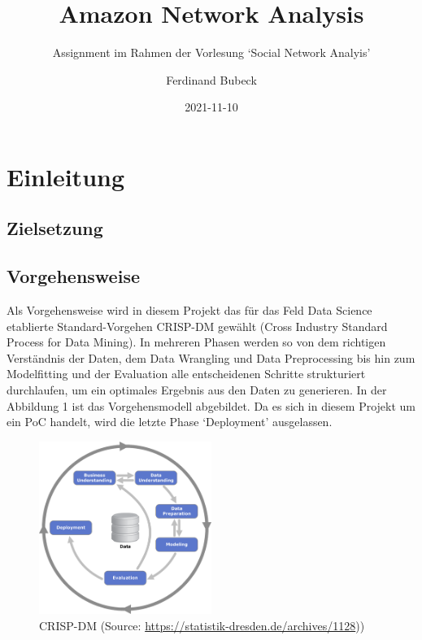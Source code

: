 \documentclass[
  12 pt,
]{article}
\title{Amazon Network Analysis}
\subtitle{Assignment im Rahmen der Vorlesung `Social Network Analyis'}
\author{Ferdinand Bubeck}
\date{2021-11-10}
\begin{document}
\maketitle

\renewcommand*\contentsname{Inhaltsverzeichnis}
{
\setcounter{tocdepth}{2}
\tableofcontents
}
\newpage

\hypertarget{einleitung}{%
\section{Einleitung}\label{einleitung}}

\hypertarget{zielsetzung}{%
\subsection{Zielsetzung}\label{zielsetzung}}

\hypertarget{vorgehensweise}{%
\subsection{Vorgehensweise}\label{vorgehensweise}}

Als Vorgehensweise wird in diesem Projekt das für das Feld Data Science
etablierte Standard-Vorgehen CRISP-DM gewählt (Cross Industry Standard
Process for Data Mining). In mehreren Phasen werden so von dem richtigen
Verständnis der Daten, dem Data Wrangling und Data Preprocessing bis hin
zum Modelfitting und der Evaluation alle entscheidenen Schritte
strukturiert durchlaufen, um ein optimales Ergebnis aus den Daten zu
generieren. In der Abbildung 1 ist das Vorgehensmodell abgebildet. Da es
sich in diesem Projekt um ein PoC handelt, wird die letzte Phase
`Deployment' ausgelassen.

\begin{figure}
\centering
\includegraphics[width=0.5\textwidth,height=\textheight]{Data/CRISP-DM_Process_Diagram1.png}
\caption{CRISP-DM (Source:
\url{https://statistik-dresden.de/archives/1128}))}
\end{figure}
\end{document}
